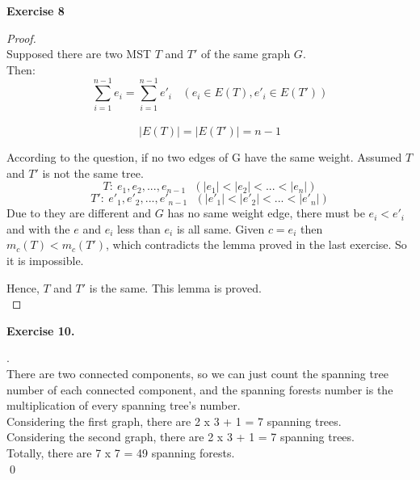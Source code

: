 \documentclass[12pt, notitlepage]{article}
\newenvironment{sol}
  {\par\vspace{3mm}\noindent{\it Solution}.}{\qed}
\begin{document}
\textbf{Exercise 8}\\
\begin{proof}
	\ \\
	Supposed there are two MST $T$ and $T'$ of the same graph $G$.\\
	Then:
	\begin{equation*}
		\sum_{i=1}^{n-1}e_i=\sum_{i=1}^{n-1}e'_i\ \ \ \ (e_i\in E(T), e'_i\in E(T'))
	\end{equation*}\
	\begin{equation*}
		|E(T)|=|E(T')|=n-1
	\end{equation*}
	
	\qquad According to the question, if no two edges of G have the same weight. Assumed $T$ and $T'$ is not the same tree.
	\begin{equation*}
		T:\ e_1, e_2, ..., e_{n-1}\ \ \ (|e_1|<|e_2|<...<|e_n|)
	\end{equation*}
	\begin{equation*}
		T':\ e'_1, e'_2, ..., e'_{n-1}\ \ \ (|e'_1|<|e'_2|<...<|e'_n|)
	\end{equation*}
	\qquad Due to they are different and $G$ has no same weight edge, there must be $e_i<e'_i$ and with the $e$ and $e_i$ less than $e_i$ is all same. Given $c=e_i$ then $m_c(T) < m_c(T')$, which contradicts the lemma proved in the last exercise. So it is impossible.
	
	\qquad Hence, $T$ and $T'$ is the same. This lemma is proved.\\
	\end{proof}

\textbf{Exercise 10.}
\begin{sol}\\
There are two connected components, so we can just count the spanning tree number of each connected component, and the spanning forests number is the multiplication of every spanning tree's number.\\
Considering the first graph, there are 2 x 3 + 1 = 7 spanning trees.\\
Considering the second graph, there are 2 x 3 + 1 = 7 spanning trees.\\
Totally, there are 7 x 7 = 49 spanning forests.\\
\end{sol}
\end{document}
